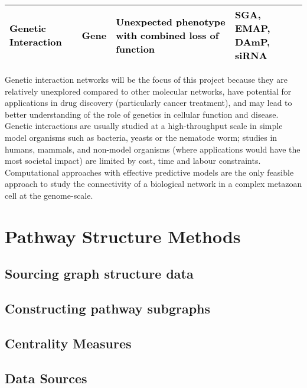 \begin{flushleft}
\begin{supertabular}{m{4.0490003cm}|m{2.55cm}|m{4.301cm}|m{4.201cm}}
\bfseries\color{black}
{\fontsize{10pt}{12.0pt}\selectfont \textcolor{black}{Genetic
Interaction}} &
\color{black}
{\fontsize{10pt}{12.0pt}\selectfont \textcolor{black}{Gene}} &
\color{black}
{\fontsize{10pt}{12.0pt}\selectfont \textcolor{black}{Unexpected
phenotype with combined loss of function}} &
\color{black}
{\fontsize{10pt}{12.0pt}\selectfont \textcolor{black}{SGA, EMAP, DAmP,
siRNA}}\\\hline
\end{supertabular}
\end{flushleft}

Genetic interaction networks will be the focus of this project because they are relatively unexplored compared to other molecular networks, have potential for applications in drug discovery (particularly cancer treatment), and may lead to better understanding of the role of genetics in cellular function and disease. Genetic interactions are usually studied at a high-throughput scale in simple model organisms such as bacteria, yeasts or the nematode worm; studies in humans, mammals, and non-model organisms (where applications would have the most societal impact) are limited by cost, time and labour constraints. Computational approaches with effective predictive models are the only feasible approach to study the connectivity of a biological network in a complex metazoan cell at the genome-scale.


\section{Pathway Structure Methods}
\subsection{Sourcing graph structure data}
\subsection{Constructing pathway subgraphs}
\subsection{Centrality Measures}


\subsection[Data Sources]{Data Sources}

